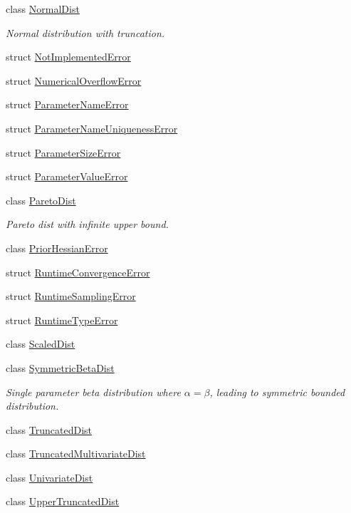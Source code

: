 \begin{DoxyCompactItemize}
class \hyperlink{classprior__hessian_1_1NormalDist}{Normal\+Dist}
\begin{DoxyCompactList}\small\item\em Normal distribution with truncation. \end{DoxyCompactList}\item 
struct \hyperlink{structprior__hessian_1_1NotImplementedError}{Not\+Implemented\+Error}
\item 
struct \hyperlink{structprior__hessian_1_1NumericalOverflowError}{Numerical\+Overflow\+Error}
\item 
struct \hyperlink{structprior__hessian_1_1ParameterNameError}{Parameter\+Name\+Error}
\item 
struct \hyperlink{structprior__hessian_1_1ParameterNameUniquenessError}{Parameter\+Name\+Uniqueness\+Error}
\item 
struct \hyperlink{structprior__hessian_1_1ParameterSizeError}{Parameter\+Size\+Error}
\item 
struct \hyperlink{structprior__hessian_1_1ParameterValueError}{Parameter\+Value\+Error}
\item 
class \hyperlink{classprior__hessian_1_1ParetoDist}{Pareto\+Dist}
\begin{DoxyCompactList}\small\item\em Pareto dist with infinite upper bound. \end{DoxyCompactList}\item 
class \hyperlink{classprior__hessian_1_1PriorHessianError}{Prior\+Hessian\+Error}
\item 
struct \hyperlink{structprior__hessian_1_1RuntimeConvergenceError}{Runtime\+Convergence\+Error}
\item 
struct \hyperlink{structprior__hessian_1_1RuntimeSamplingError}{Runtime\+Sampling\+Error}
\item 
struct \hyperlink{structprior__hessian_1_1RuntimeTypeError}{Runtime\+Type\+Error}
\item 
class \hyperlink{classprior__hessian_1_1ScaledDist}{Scaled\+Dist}
\item 
class \hyperlink{classprior__hessian_1_1SymmetricBetaDist}{Symmetric\+Beta\+Dist}
\begin{DoxyCompactList}\small\item\em Single parameter beta distribution where $\alpha = \beta$, leading to symmetric bounded distribution. \end{DoxyCompactList}\item 
class \hyperlink{classprior__hessian_1_1TruncatedDist}{Truncated\+Dist}
\item 
class \hyperlink{classprior__hessian_1_1TruncatedMultivariateDist}{Truncated\+Multivariate\+Dist}
\item 
class \hyperlink{classprior__hessian_1_1UnivariateDist}{Univariate\+Dist}
\item 
class \hyperlink{classprior__hessian_1_1UpperTruncatedDist}{Upper\+Truncated\+Dist}
\end{DoxyCompactItemize}
